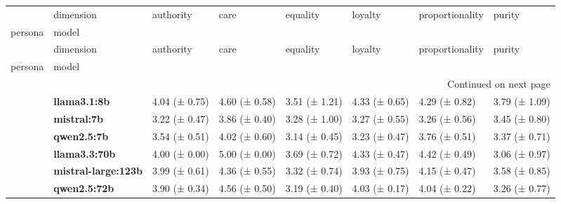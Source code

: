 \begin{longtable}{llllllll}
\toprule
 & dimension & authority & care & equality & loyalty & proportionality & purity \\
persona & model &  &  &  &  &  &  \\
\midrule
\endfirsthead
\toprule
 & dimension & authority & care & equality & loyalty & proportionality & purity \\
persona & model &  &  &  &  &  &  \\
\midrule
\endhead
\midrule
\multicolumn{8}{r}{Continued on next page} \\
\midrule
\endfoot
\bottomrule
\endlastfoot
\multirow[t]{6}{*}{\textbf{base}} & \textbf{llama3.1:8b} & 4.04 (± 0.75) & 4.60 (± 0.58) & 3.51 (± 1.21) & 4.33 (± 0.65) & 4.29 (± 0.82) & 3.79 (± 1.09) \\
\textbf{} & \textbf{mistral:7b} & 3.22 (± 0.47) & 3.86 (± 0.40) & 3.28 (± 1.00) & 3.27 (± 0.55) & 3.26 (± 0.56) & 3.45 (± 0.80) \\
\textbf{} & \textbf{qwen2.5:7b} & 3.54 (± 0.51) & 4.02 (± 0.60) & 3.14 (± 0.45) & 3.23 (± 0.47) & 3.76 (± 0.51) & 3.37 (± 0.71) \\
\textbf{} & \textbf{llama3.3:70b} & 4.00 (± 0.00) & 5.00 (± 0.00) & 3.69 (± 0.72) & 4.33 (± 0.47) & 4.42 (± 0.49) & 3.06 (± 0.97) \\
\textbf{} & \textbf{mistral-large:123b} & 3.99 (± 0.61) & 4.36 (± 0.55) & 3.32 (± 0.74) & 3.93 (± 0.75) & 4.15 (± 0.47) & 3.58 (± 0.85) \\
\textbf{} & \textbf{qwen2.5:72b} & 3.90 (± 0.34) & 4.56 (± 0.50) & 3.19 (± 0.40) & 4.03 (± 0.17) & 4.04 (± 0.22) & 3.26 (± 0.77) \\
\cline{1-8}
\end{longtable}
